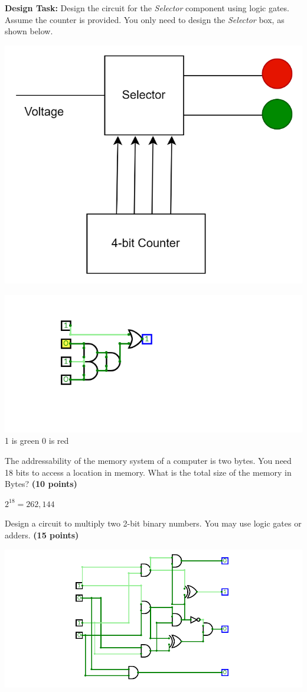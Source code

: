 \documentclass[10pt,answers]{exam}
\newcommand{\qpoints}[1]{\hfill \textbf{(#1 points)}}
\begin{document}
\begin{questions}
\textbf{Design Task:} Design the circuit for the \textit{Selector} component using logic gates. Assume the counter is provided. You only need to design the \textit{Selector} box, as shown below.

\begin{center}
\includegraphics[width=0.6\linewidth]{images/ex3.png}
\end{center}

\begin{solution}
    \begin{center}
		\includegraphics[width=0.6\linewidth]{ex3.png}
		1 is green 0 is red
		\end{center}
\end{solution}


\question The addressability of the memory system of a computer is two bytes. You need 18 bits to access a location in memory. What is the total size of the memory in Bytes? \qpoints{10}

\begin{solution}
    $2^{18} = 262,144$
\end{solution}


\question Design a circuit to multiply two 2-bit binary numbers. You may use logic gates or adders. \qpoints{15}

\begin{solution}
    \begin{center}
		\includegraphics[width=0.6\linewidth]{ex5.png}
	\end{center}
\end{solution}




\end{questions}
\end{document}
